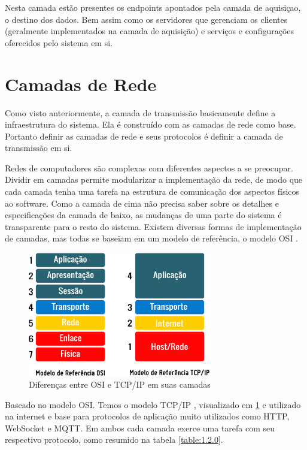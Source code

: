 Nesta camada estão presentes os endpoints apontados pela camada de aquisiçao, o destino dos dados. Bem assim como os servidores que gerenciam os clientes (geralmente implementados na camada de aquisição) e serviços e configurações oferecidos pelo sistema em si.

\section{Camadas de Rede}
\label{section:camadas_de_rede}

Como visto anteriormente, a camada de transmissão basicamente define a infraestrutura do sistema. Ela é construído com as camadas de rede como base. Portanto definir as camadas de rede e seus protocolos é definir a camada de transmissão em si.

Redes de computadores são complexas com diferentes aspectos a se preocupar. Dividir em camadas permite modularizar a implementação da rede, de modo que cada camada tenha uma tarefa na estrutura de comunicação dos aspectos físicos ao software. Como a camada de cima não precisa saber sobre os detalhes e especificações da camada de baixo, as mudanças de uma parte do sistema é transparente para o resto do sistema. Existem diversas formas de implementação de camadas, mas todas se baseiam em um modelo de referência, o modelo OSI \cite{Zimmermann:1988:ORM:59309.59310}.


\begin{figure}[h!]
\centering
\includegraphics[width=8cm]{./02_Capitulos/02_Cap1/figures/modelo_osi_tcpip}
\caption{Diferenças entre OSI e TCP/IP em suas camadas}
\label{fig:1.2.0/modelo_osi_tcpip}
\end{figure}

Baseado no modelo OSI. Temos o modelo TCP/IP \cite{TCPIP}, visualizado em \ref{fig:1.2.0/modelo_osi_tcpip} e utilizado na internet e base para protocolos de aplicação muito utilizados como HTTP, WebSocket e MQTT. Em ambos cada camada exerce uma tarefa com seu respectivo protocolo, como resumido na tabela \ref{table:1.2.0}.

